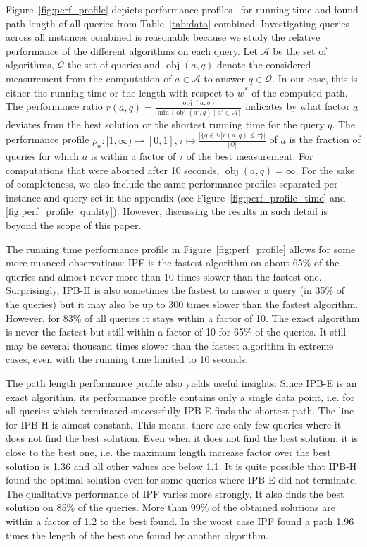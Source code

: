 \documentclass[a4paper,UKenglish,cleveref, autoref, thm-restate]{lipics-v2021}
\begin{document}
Figure~\ref{fig:perf_profile} depicts performance profiles~\cite{dolan2002benchmarking} for running time and found path length of all queries from Table~\ref{tab:data} combined.
Investigating queries across all instances combined is reasonable because we study the relative performance of the different algorithms on each query.
Let $\mathcal{A}$ be the set of algorithms, $\mathcal{Q}$ the set of queries and $\operatorname{obj}(a, q)$ denote the considered measurement from the computation of $a \in \mathcal{A}$ to answer $q \in \mathcal{Q}$.
In our case, this is either the running time or the length with respect to $w^*$ of the computed path.
The performance ratio $r(a,q) = \frac{\operatorname{obj}(a, q)}{\min{\{\operatorname{obj}(a', q) \mid a' \in \mathcal{A}\}}}$ indicates by what factor $a$ deviates from the best solution or the shortest running time for the query $q$.
The performance profile $\rho_a : [1,\infty) \to [0,1], \tau \mapsto \frac{|\{q \in \mathcal{Q} | r(a, q) \leq \tau \}|}{|\mathcal{Q}|}$ of $a$ is the fraction of queries for which $a$ is within a factor of $\tau$ of the best measurement.
For computations that were aborted after 10 seconds, $\operatorname{obj}(a, q) = \infty$.
For the sake of completeness, we also include the same performance profiles separated per instance and query set in the appendix (see Figure~\ref{fig:perf_profile_time} and \ref{fig:perf_profile_quality}).
However, discussing the results in such detail is beyond the scope of this paper.

The running time performance profile in Figure~\ref{fig:perf_profile} allows for some more nuanced observations:
IPF is the fastest algorithm on about 65\% of the queries and almost never more than 10 times slower than the fastest one.
Surprisingly, IPB-H is also sometimes the fastest to answer a query (in 35\% of the queries) but it may also be up to 300 times slower than the fastest algorithm.
However, for 83\% of all queries it stays within a factor of 10.
The exact algorithm is never the fastest but still within a factor of 10 for 65\% of the queries.
It still may be several thousand times slower than the fastest algorithm in extreme cases, even with the running time limited to 10 seconds.

The path length performance profile also yields useful insights.
Since IPB-E is an exact algorithm, its performance profile contains only a single data point, i.e. for all queries which terminated successfully IPB-E finds the shortest path.
The line for IPB-H is almost constant.
This means, there are only few queries where it does not find the best solution.
Even when it does not find the best solution, it is close to the best one, i.e. the maximum length increase factor over the best solution is 1.36 and all other values are below 1.1.
It is quite possible that IPB-H found the optimal solution even for some queries where IPB-E did not terminate.
The qualitative performance of IPF varies more strongly.
It also finds the best solution on 85\% of the queries.
More than 99\% of the obtained solutions are within a factor of 1.2 to the best found.
In the worst case IPF found a path 1.96 times the length of the best one found by another algorithm.
\end{document}
